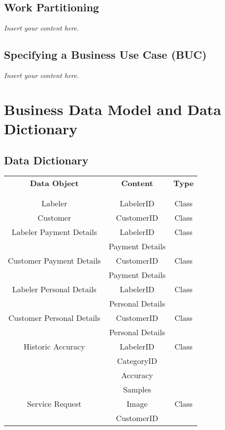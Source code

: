 \documentclass[12pt]{article}
\newcommand{\lips}{\textit{Insert your content here.}}
\begin{document}
\subsection{Work Partitioning}
\lips
\subsection{Specifying a Business Use Case (BUC)}
\lips

\section{Business Data Model and Data Dictionary}
\subsection{Data Dictionary}
\begin{center}
\begin{tabular}{ |c|c|c| } %
  \hline
    \textbf{Data Object} & \hspace{80pt} \textbf{Content} \hspace{80pt} & \textbf{Type} \\
    & & \\
    & & \\
    \hline
    Labeler &  LabelerID & Class \\ 
    \hline
    Customer &  CustomerID & Class \\ 
    \hline
    Labeler Payment Details &  LabelerID & Class \\ 
    &  Payment Details & \\
    \hline
    Customer Payment Details &  CustomerID & Class \\ 
    &  Payment Details & \\
    \hline
    Labeler Personal Details &  LabelerID & Class \\ 
    &  Personal Details & \\
    \hline
    Customer Personal Details &  CustomerID & Class \\ 
    &  Personal Details & \\
    \hline
    Historic Accuracy &  LabelerID & Class \\ 
    &  CategoryID & \\
    &  Accuracy & \\
    &  Samples & \\
    \hline
    Service Request &  Image & Class \\ 
    &  CustomerID & \\

\end{tabular}
\end{center}
\end{document}
